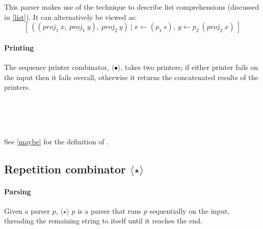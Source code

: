 \documentclass[12pt,a4paper,twoside,openright]{report}
\newcommand{\F}{\AgdaFunction}
\begin{document}
This parser makes use of the technique to describe list comprehensions (discussed in \autoref{list}). It can alternatively be viewed as:
$$[\ ((proj_1\ x,\ proj_1\ y),\ proj_2\ y)\ |\ x \leftarrow (p_1\ s),\ y \leftarrow p_2\ (proj_2\ x)\ ]$$
\paragraph{Printing}
{The sequence printer combinator, $\langle\bullet\rangle$, takes two printers; if either printer fails on the input then it fails overall, otherwise it returns the concatenated results of the printers}.

\begin{code}
\> \AgdaSymbol{:} \AgdaSymbol{\{}  \AgdaSymbol{:} \AgdaSymbol{\}}         \AgdaSymbol{(}  \AgdaSymbol{)}\<%
\\
\> \AgdaSymbol{(} \AgdaSymbol{)} \AgdaSymbol{(} \AgdaSymbol{)} \AgdaSymbol{=}      \>[54]\AgdaFunction{\_++\_}\<%
\\
\>[54]\AgdaSymbol{(} \AgdaSymbol{(} \AgdaSymbol{))}\<%
\\
\>[54]\AgdaSymbol{(} \AgdaSymbol{(} \AgdaSymbol{)))}\<%
\end{code}

See \autoref{maybe} for the definition of \F{liftM2}.

\subsection{Repetition combinator $\langle\star\rangle$}

\paragraph{Parsing}
{Given a parser $p$, {$\langle\star\rangle$ $p$} is a parser that runs {$p$} sequentially on the input, threading the remaining string to itself until it reaches the end}.
\end{document}
